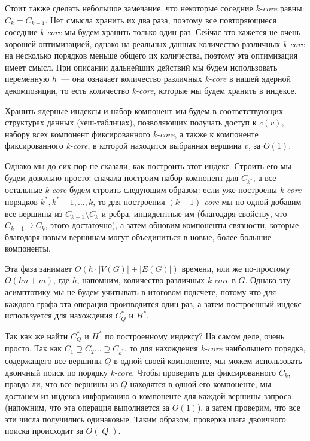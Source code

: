 \documentclass[11pt,a4paper,oneside]{article}
\begin{document}
Стоит также сделать небольшое замечание, что некоторые соседние \textit{k-core} равны: $C_k = C_{k + 1}$. Нет смысла хранить их два раза, поэтому все повторяющиеся соседние \textit{k-core} мы будем хранить только один раз. Сейчас это кажется не очень хорошей оптимизацией, однако на реальных данных количество различных \textit{k-core} на несколько порядков меньше общего их количества, поэтому эта оптимизация имеет смысл. При описании дальнейших действий мы будем использовать переменную $h$~--- она означает количество различных \textit{k-core} в нашей ядерной декомпозиции, то есть количество \textit{k-core}, которые мы будем хранить в индексе.

Хранить ядерные индексы и набор компонент мы будем в соответствующих структурах данных (хеш-таблицах), позволяющих получать доступ к $c(v)$, набору всех компонент фиксированного \textit{k-core}, а также к компоненте фиксированного \textit{k-core}, в которой находится выбранная вершина $v$, за $O(1)$.

Однако мы до сих пор не сказали, как построить этот индекс. Строить его мы будем довольно просто: сначала построим набор компонент для $C_{k^*}$, а все остальные \textit{k-core} будем строить следующим образом: если уже построены \textit{k-core} порядков $k^*, k^*-1, \ldots, k$, то для построения \textit{$(k - 1)$-core} мы по одной добавим все вершины из $C_{k - 1} \setminus C_k$  и ребра, инцидентные им (благодаря свойству, что $C_{k - 1} \supseteq C_k$, этого достаточно), а затем обновим компоненты связности, которые благодаря новым вершинам могут объединиться в новые, более большие компоненты.

Эта фаза занимает $O(h \cdot |V(G)| + |E(G)|)$ времени, или же по-простому $O(hn + m)$, где $h$, напомним, количество различных \textit{k-core} в $G$. Однако эту асимптотику мы не будем учитывать в итоговом подсчете, потому что для каждого графа эта операция производится один раз, а затем построенный индекс используется для нахождения $C_Q^*$ и $H^*$.

Так как же найти $C_Q^*$ и $H^*$ по построенному индексу? На самом деле, очень просто. Так как $C_1 \supseteq C_2 \ldots \supseteq C_{k^*}$, то для нахождения \textit{k-core} наибольшего порядка, содержащего все вершины $Q$ в одной своей компоненте, мы можем использовать двоичный поиск по порядку \textit{k-core}. Чтобы проверить для фиксированного $C_k$, правда ли, что все вершины из $Q$ находятся в одной его компоненте, мы достанем из индекса информацию о компоненте для каждой вершины-запроса (напомним, что эта операция выполняется за $O(1)$), а затем проверим, что все эти числа получились одинаковые. Таким образом, проверка шага двоичного поиска происходит за $O(|Q|)$.
\end{document}
